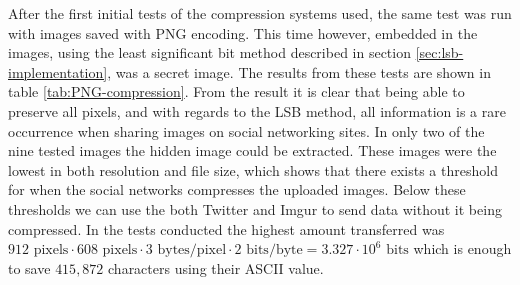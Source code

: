 After the first initial tests of the compression systems used, the same test was run with images saved with PNG encoding.
This time however, embedded in the images, using the least significant bit method described in section \ref{sec:lsb-implementation}, was a secret image. 
The results from these tests are shown in table \ref{tab:PNG-compression}.
From the result it is clear that being able to preserve all pixels, and with regards to the LSB method, all information is a rare occurrence when sharing images on social networking sites. In only two of the nine tested images the hidden image could be extracted. 
These images were the lowest in both resolution and file size, which shows that there exists a threshold for when the social networks compresses the uploaded images. 
Below these thresholds we can use the both Twitter and Imgur to send data without it being compressed. In the tests conducted the highest amount transferred was $912\text{ pixels} \cdot 608\text{ pixels} \cdot 3\text{ bytes/pixel} \cdot 2\text{ bits/byte} = 3.327\cdot 10^6\text{ bits}$ which is enough to save $415,872$ characters using their ASCII value.\\ 


